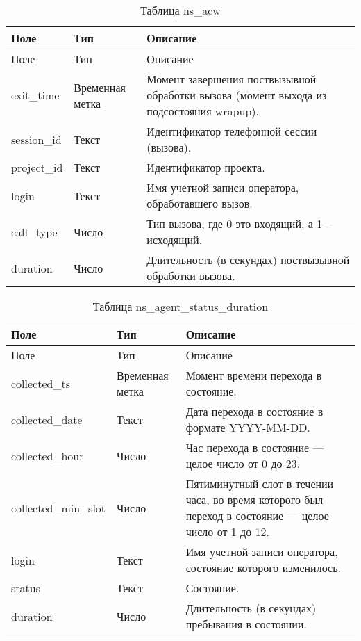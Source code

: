 \begin{small}
    \begin{longtable}{|p{}|p{}|p{}|}
        \caption{Таблица ns\_acw}
        \label{tab:db:ns-acw}
        \\ \hline
        Поле & Тип & Описание \\
        \hline \endfirsthead
        \hline
        Поле & Тип & Описание \\
        \hline
        \endhead
        \hline \endlastfoot
        exit\_time & Временная метка & Момент завершения поствызывной обработки вызова (момент выхода из подсостояния wrapup). \\
        \hline
        session\_id & Текст & Идентификатор телефонной сессии (вызова). \\
        \hline
        project\_id & Текст & Идентификатор проекта. \\
        \hline
        login & Текст & Имя учетной записи оператора, обработавшего вызов. \\
        \hline
        call\_type & Число & Тип вызова, где 0 это входящий, а 1 -- исходящий. \\
        \hline
        duration & Число & Длительность (в секундах) поствызывной обработки вызова. \\
    \end{longtable}
\end{small}

\begin{small}
    \begin{longtable}{|p{}|p{}|p{}|}
        \caption{Таблица ns\_agent\_status\_duration}
        \label{tab:db:ns-agent-status-duration}
        \\ \hline
        Поле & Тип & Описание \\
        \hline \endfirsthead
        \hline
        Поле & Тип & Описание \\
        \hline
        \endhead
        \hline \endlastfoot
        collected\_ts & Временная метка & Момент времени перехода в состояние. \\
        \hline
        collected\_date & Текст & Дата перехода в состояние в формате YYYY-MM-DD.\\
        \hline
        collected\_hour & Число & Час перехода в состояние — целое число от 0 до 23.\\
        \hline
        collected\_min\_slot & Число & Пятиминутный слот в течении часа, во время которого был переход в состояние — целое число от 1 до 12.\\
        \hline
        login & Текст & Имя учетной записи оператора, состояние которого изменилось.\\
        \hline
        status & Текст & Состояние.\\
        \hline
        duration & Число & Длительность (в секундах) пребывания в состоянии.\\
    \end{longtable}
\end{small}

